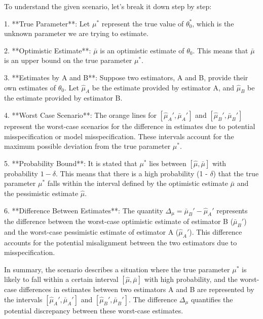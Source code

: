 To understand the given scenario, let's break it down step by step:

1. **True Parameter**: Let \(\mu^*\) represent the true value of \(\theta_0^*\), which is the unknown parameter we are trying to estimate.

2. **Optimistic Estimate**: \(\bar{\mu}\) is an optimistic estimate of \(\theta_0\). This means that \(\bar{\mu}\) is an upper bound on the true parameter \(\mu^*\).

3. **Estimates by A and B**: Suppose two estimators, A and B, provide their own estimates of \(\theta_0\). Let \(\hat{\mu}_A\) be the estimate provided by estimator A, and \(\hat{\mu}_B\) be the estimate provided by estimator B.

4. **Worst Case Scenario**: The orange lines for \([\hat{\mu}_A', \bar{\mu}_A']\) and \([\hat{\mu}_B', \bar{\mu}_B']\) represent the worst-case scenarios for the difference in estimates due to potential misspecification or model misspecification. These intervals account for the maximum possible deviation from the true parameter \(\mu^*\).

5. **Probability Bound**: It is stated that \(\mu^*\) lies between \([\hat{\mu}, \bar{\mu}]\) with probability \(1 - \delta\). This means that there is a high probability (1 - \(\delta\)) that the true parameter \(\mu^*\) falls within the interval defined by the optimistic estimate \(\bar{\mu}\) and the pessimistic estimate \(\hat{\mu}\).

6. **Difference Between Estimates**: The quantity \(\Delta_{\mu} = \bar{\mu}_B' - \hat{\mu}_A'\) represents the difference between the worst-case optimistic estimate of estimator B (\(\bar{\mu}_B'\)) and the worst-case pessimistic estimate of estimator A (\(\hat{\mu}_A'\)). This difference accounts for the potential misalignment between the two estimators due to misspecification.

In summary, the scenario describes a situation where the true parameter \(\mu^*\) is likely to fall within a certain interval \([\hat{\mu}, \bar{\mu}]\) with high probability, and the worst-case differences in estimates between two estimators A and B are represented by the intervals \([\hat{\mu}_A', \bar{\mu}_A']\) and \([\hat{\mu}_B', \bar{\mu}_B']\). The difference \(\Delta_{\mu}\) quantifies the potential discrepancy between these worst-case estimates.